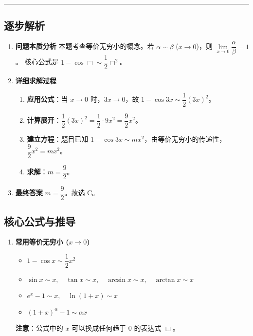 \documentclass[UTF8,10pt]{ctexart}
\newenvironment{redenv}{\color{red}}{}
\newenvironment{detailedanalysis}{%
    \color{red}
    \begin{enumerate}[label=\textbf{第\arabic*步：}, leftmargin=*, align=left, itemsep=0pt, parsep=0pt, topsep=0pt, partopsep=0pt]
}{%
    \end{enumerate}
}
\newenvironment{formuladerivation}{%
    \begin{enumerate}[label={\textbf{公式\arabic*：}}, leftmargin=*, align=left, itemsep=0pt, parsep=0pt]
}{%
    \end{enumerate}
}
\newcommand{\analysisrule}{\noindent\rule{\textwidth}{0.8pt}\vspace{-0.5em}}
\begin{document}
\begin{redenv}
\analysisrule
\subsection*{逐步解析}

\begin{detailedanalysis}
\item \textbf{问题本质分析}
本题考查等价无穷小的概念。若 $\alpha \sim \beta$ ($x \to 0$)，则 $\lim\limits_{x\to 0} \dfrac{\alpha}{\beta} = 1$。
核心公式是 $1 - \cos \Box \sim \dfrac{1}{2}\Box^2$。

\item \textbf{详细求解过程}
\begin{enumerate}[label=(\alph*)]
    \item \textbf{应用公式}：当 $x \to 0$ 时，$3x \to 0$，故 $1 - \cos 3x \sim \dfrac{1}{2}(3x)^2$。
    \item \textbf{计算展开}：$\dfrac{1}{2}(3x)^2 = \dfrac{1}{2} \cdot 9x^2 = \dfrac{9}{2}x^2$。
    \item \textbf{建立方程}：题目已知 $1 - \cos 3x \sim mx^2$，由等价无穷小的传递性，$\dfrac{9}{2}x^2 = mx^2$。
    \item \textbf{求解}：$m = \dfrac{9}{2}$。
\end{enumerate}

\item \textbf{最终答案}
$m = \dfrac{9}{2}$。故选 C。
\end{detailedanalysis}

\subsection*{核心公式与推导}
\begin{formuladerivation}
\item \textbf{常用等价无穷小 ($x \to 0$)}
\begin{itemize}
    \item $1 - \cos x \sim \dfrac{1}{2}x^2$
    \item $\sin x \sim x, \quad \tan x \sim x, \quad \arcsin x \sim x, \quad \arctan x \sim x$
    \item $e^x - 1 \sim x, \quad \ln(1+x) \sim x$
    \item $(1+x)^\alpha - 1 \sim \alpha x$
\end{itemize}
\textbf{注意}：公式中的 $x$ 可以换成任何趋于 0 的表达式 $\Box$。
\end{formuladerivation}


\end{redenv}
\end{document}
